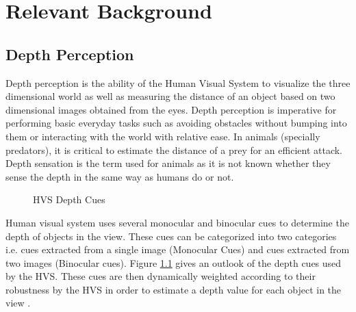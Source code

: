\chapter{Relevant Background}
\label{chap:reletiveBackground}

\section{Depth Perception}
Depth perception is the ability of the Human Visual System  to visualize the three dimensional world as well as measuring the distance of an object based on two dimensional images obtained from the eyes. Depth perception is imperative for performing basic everyday tasks such as avoiding obstacles without bumping into them or interacting with the world with relative ease. In animals (specially predators), it is critical to estimate the distance of a prey for an efficient attack. Depth sensation is the term used for animals as it is not known whether they sense the depth in the same way as humans do or not\cite{ wiki:depth_perception}.

\begin{figure}
\caption{HVS Depth Cues\label{fig:CueTree}}
\end{figure}

Human visual system  uses several monocular and binocular cues to determine the depth of objects in the view. These cues can be categorized into two categories i.e. cues extracted from a single image (Monocular Cues) and cues extracted from two images (Binocular cues)\cite{depthcues1}\cite{ wiki:depth_perception}. Figure \ref{fig:CueTree} gives an outlook of the depth cues used by the HVS. These cues are then dynamically weighted according to their robustness by the HVS in order to estimate a depth value for each object in the view \cite{CueFusion}.


